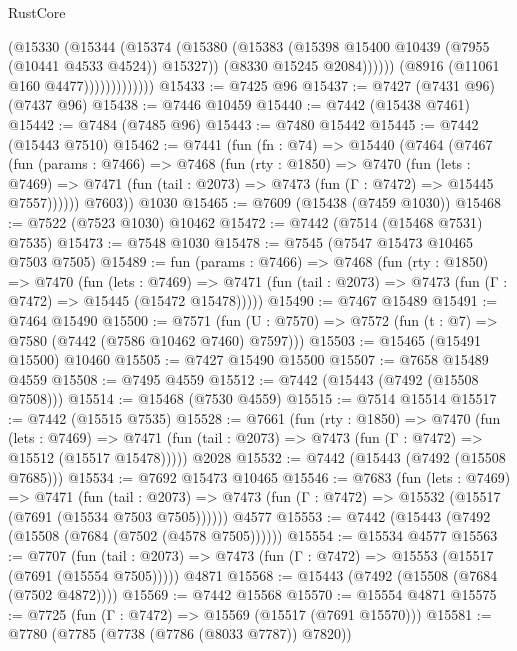 \begin{lexlean}{RustCore}
\begin{coremodule}
                            (@15330
                              (@15344
                                (@15374
                                  (@15380
                                    (@15383
                                      (@15398 @15400 @10439 (@7955 (@10441 @4533 @4524)) @15327))
                                    (@8330 @15245 @2084))))))
                          (@8916 (@11061 @160 @4477)))))))))))))
@15433 := @7425 @96
@15437 := @7427 (@7431 @96) (@7437 @96)
@15438 := @7446 @10459
@15440 := @7442 (@15438 @7461)
@15442 := @7484 (@7485 @96)
@15443 := @7480 @15442
@15445 := @7442 (@15443 @7510)
@15462 := @7441
    (fun (fn : @74) =>
    @15440
      (@7464
        (@7467
          (fun (params : @7466) =>
          @7468
            (fun (rty : @1850) =>
            @7470
              (fun (lets : @7469) =>
              @7471 (fun (tail : @2073) => @7473 (fun (Γ : @7472) => @15445 @7557))))))
        @7603))
    @1030
@15465 := @7609 (@15438 (@7459 @1030))
@15468 := @7522 (@7523 @1030) @10462
@15472 := @7442 (@7514 (@15468 @7531) @7535)
@15473 := @7548 @1030
@15478 := @7545 (@7547 @15473 @10465 @7503 @7505)
@15489 := fun (params : @7466) =>
  @7468
    (fun (rty : @1850) =>
    @7470
      (fun (lets : @7469) =>
      @7471 (fun (tail : @2073) => @7473 (fun (Γ : @7472) => @15445 (@15472 @15478)))))
@15490 := @7467 @15489
@15491 := @7464 @15490
@15500 := @7571
    (fun (U : @7570) => @7572 (fun (t : @7) => @7580 (@7442 (@7586 @10462 @7460) @7597)))
@15503 := @15465 (@15491 @15500) @10460
@15505 := @7427 @15490 @15500
@15507 := @7658 @15489 @4559
@15508 := @7495 @4559
@15512 := @7442 (@15443 (@7492 (@15508 @7508)))
@15514 := @15468 (@7530 @4559)
@15515 := @7514 @15514
@15517 := @7442 (@15515 @7535)
@15528 := @7661
    (fun (rty : @1850) =>
    @7470
      (fun (lets : @7469) =>
      @7471 (fun (tail : @2073) => @7473 (fun (Γ : @7472) => @15512 (@15517 @15478)))))
    @2028
@15532 := @7442 (@15443 (@7492 (@15508 @7685)))
@15534 := @7692 @15473 @10465
@15546 := @7683
    (fun (lets : @7469) =>
    @7471
      (fun (tail : @2073) =>
      @7473 (fun (Γ : @7472) => @15532 (@15517 (@7691 (@15534 @7503 @7505))))))
    @4577
@15553 := @7442 (@15443 (@7492 (@15508 (@7684 (@7502 (@4578 @7505))))))
@15554 := @15534 @4577
@15563 := @7707
    (fun (tail : @2073) => @7473 (fun (Γ : @7472) => @15553 (@15517 (@7691 (@15554 @7505)))))
    @4871
@15568 := @15443 (@7492 (@15508 (@7684 (@7502 @4872))))
@15569 := @7442 @15568
@15570 := @15554 @4871
@15575 := @7725 (fun (Γ : @7472) => @15569 (@15517 (@7691 @15570)))
@15581 := @7780 (@7785 (@7738 (@7786 (@8033 @7787)) @7820))

\end{coremodule}
\end{lexlean}
